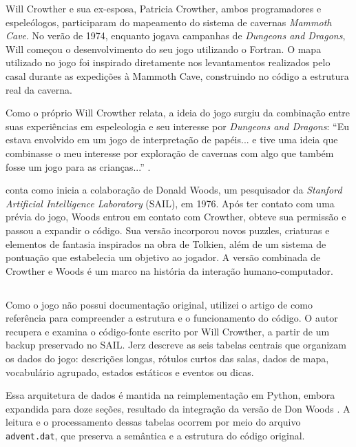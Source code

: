 \documentclass[12pt,a4paper]{article}
\begin{document}
Will Crowther e sua ex-esposa, Patricia Crowther, ambos programadores e espeleólogos, participaram do mapeamento do sistema de cavernas \textit{Mammoth Cave}. No verão de 1974, enquanto jogava campanhas de \textit{Dungeons and Dragons}, Will começou o desenvolvimento do seu jogo utilizando o Fortran. O mapa utilizado no jogo foi inspirado diretamente nos levantamentos realizados pelo casal durante as expedições à Mammoth Cave, construindo no código a estrutura real da caverna.

Como o próprio Will Crowther relata, a ideia do jogo surgiu da combinação entre suas experiências em espeleologia e seu interesse por \textit{Dungeons and Dragons}: “Eu estava envolvido em um jogo de interpretação de papéis... e tive uma ideia que combinasse o meu interesse por exploração de cavernas com algo que também fosse um jogo para as crianças...” \textcite{peterson1983genesis}.

\textcite{levy2010hackers} conta como inicia a colaboração de Donald Woods, um pesquisador da \textit{Stanford Artificial Intelligence Laboratory} (SAIL), em 1976. Após ter contato com uma prévia do jogo, Woods entrou em contato com Crowther, obteve sua permissão e passou a expandir o código. Sua versão incorporou novos puzzles, criaturas e elementos de fantasia inspirados na obra de Tolkien, além de um sistema de pontuação que estabelecia um objetivo ao jogador. A versão combinada de Crowther e Woods é um marco na história da interação humano-computador.

\subsection{}
Como o jogo não possui documentação original, utilizei o artigo de \textcite{jerz2007colossal} como referência para compreender a estrutura e o funcionamento do código. O autor recupera e examina o código-fonte escrito por Will Crowther, a partir de um backup preservado no SAIL. Jerz descreve as seis tabelas centrais que organizam os dados do jogo: descrições longas, rótulos curtos das salas, dados de mapa, vocabulário agrupado, estados estáticos e eventos ou dicas.  

Essa arquitetura de dados é mantida na reimplementação em Python, embora expandida para doze seções, resultado da integração da versão de Don Woods \textcite{rhodes_adventure_py}. A leitura e o processamento dessas tabelas ocorrem por meio do arquivo \texttt{advent.dat}, que preserva a semântica e a estrutura do código original. 
\end{document}
